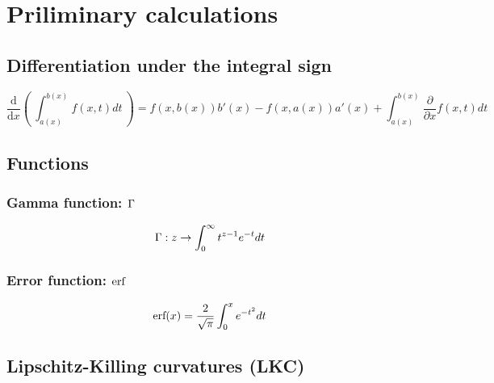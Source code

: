 \documentclass[12pt]{article}
\begin{document}

\tableofcontents
\newpage
\section{Priliminary calculations}
\subsection{Differentiation under the integral sign}
\begin{equation}
  \frac{\text{d}}{\text{d}x}\left(\ \int_{a(x)}^{b(x)} f(x,t) dt \ \right) = f(x,b(x))b'(x)-f(x,a(x))a'(x)+\int_{a(x)}^{b(x)}\frac{\partial}{\partial x}f(x,t)dt
\end{equation}
\subsection{Functions}
\subsubsection{Gamma function: $\Gamma$}
\begin{equation}\Gamma: z \rightarrow \int_0^\infty t^{z-1}e^{-t} dt\end{equation}
\subsubsection{Error function: $\text{erf}$}
\begin{equation}\text{erf}(x)=\frac{2}{\sqrt\pi}\int_0^xe^{-t^2}dt\end{equation}
\subsection{Lipschitz-Killing curvatures (LKC)}
\end{document}
